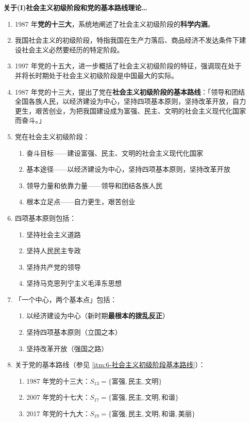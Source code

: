 \documentclass[UTF8]{ctexart}
\newcommand\Emph[2]{\colorbox{c#1-light}{\textcolor{c#1-emph}{\textbf{#2}}}}
\begin{document}
\begin{mybox}{6}
\textbf{关于(I)社会主义初级阶段和党的基本路线理论…}
\begin{enumerate}
  \item 1987 年\Emph{6}{党的十三大}，系统地阐述了社会主义初级阶段的\Emph{6}{科学内涵}。
  \item 我国社会主义的初级阶段，特指我国在生产力落后、商品经济不发达条件下建设社会主义必然要经历的特定阶段。
  \item 1997 年党的十五大，进一步概括了社会主义初级阶段的特征，强调现在处于并将长时期处于社会主义初级阶段是中国最大的实际。
  \item\label{itm:6-社会主义初级阶段基本路线} 1987 年党的十三大，提出了党在\Emph{6}{社会主义初级阶段的基本路线}：「领导和团结全国各族人民，以经济建设为中心，坚持四项基本原则，坚持改革开放，自力更生，艰苦创业，为把我国建设成为富强、民主、文明的社会主义现代化国家而奋斗。」
  \item 党在社会主义初级阶段：
  \begin{enumerate}[label={\roman{enumii})}]
    \item 奋斗目标——建设富强、民主、文明的社会主义现代化国家
    \item 基本途径——以经济建设为中心，坚持四项基本原则，坚持改革开放
    \item 领导力量和依靠力量——领导和团结各族人民
    \item 根本立足点——自力更生，艰苦创业
  \end{enumerate}
  \item 四项基本原则包括：
  \begin{enumerate}[label={\roman{enumii})},start=1]
    \item 坚持社会主义道路
    \item 坚持人民民主专政
    \item 坚持共产党的领导
    \item 坚持马克思列宁主义毛泽东思想
  \end{enumerate}
  \item 「一个中心，两个基本点」包括：
  \begin{enumerate}[label={\roman{enumii})}, start=1]
    \item 以经济建设为中心（新时期\Emph{6}{最根本的拨乱反正}）
    \item 坚持四项基本原则（立国之本）
    \item 坚持改革开放（强国之路）
  \end{enumerate}
  \item 关于党的基本路线\textcolor{c6-emph}{（参见 \ref{itm:6-社会主义初级阶段基本路线}）}：
  \begin{enumerate}[label={\roman{enumii})}, start=1]
    \item 1987 年党的十三大：$S_{13} = \{\text{富强},\text{民主},\text{文明}\}$
    \item 2007 年党的十七大：$S_{17} = \{\text{富强},\text{民主},\text{文明},\text{和谐}\}$
    \item 2017 年党的十九大：$S_{19} = \{\text{富强},\text{民主},\text{文明},\text{和谐},\text{美丽}\}$
  \end{enumerate}
\end{enumerate}
\end{mybox}
\end{document}
